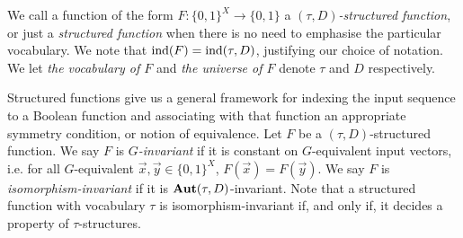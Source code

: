 \documentclass[../paper.tex]{subfiles}
\begin{document}
We call a function of the form $F:\{0,1\}^{X} \rightarrow \{0,1\}$ a
\emph{$(\tau, D)$-structured function}, or just a \emph{structured function}
when there is no need to emphasise the particular vocabulary. We note that
$\text{\upshape ind}(F) = \text{\upshape ind}(\tau, D)$, justifying our choice of notation. We let \emph{the
  vocabulary of $F$} and \emph{the universe of $F$} denote $\tau$ and $D$
respectively.




Structured functions give us a general framework for indexing the input sequence
to a Boolean function and associating with that function an appropriate symmetry
condition, or notion of equivalence. Let $F$ be a $(\tau, D)$-structured
function. We say $F$ is \emph{$G$-invariant} if it is constant on $G$-equivalent
input vectors, i.e. for all $G$-equivalent $\vec{x}, \vec{y} \in \{0,1\}^{X}$,
$F(\vec{x}) = F(\vec{y})$. We say $F$ is \emph{isomorphism-invariant} if it is
$\text{\textbf{Aut}}(\tau, D)$-invariant. Note that a structured function with vocabulary
$\tau$ is isomorphism-invariant if, and only if, it decides a property of
$\tau$-structures.
\end{document}
